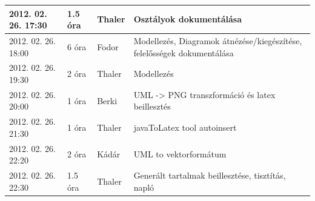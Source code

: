 \begin{center}
\begin{tabular}{| l | p{1.9cm} | p{2.6cm} | p{6.1cm} |}
2012. 02. 26. 17:30 & 1.5 óra & Thaler & Osztályok dokumentálása\\ \hline
2012. 02. 26. 18:00 & 6 óra & Fodor & Modellezés, Diagramok átnézése/kiegészítése, felelősségek dokumentálása\\ \hline
2012. 02. 26. 19:30 & 2 óra & Thaler & Modellezés\\ \hline
2012. 02. 26. 20:00 & 1 óra & Berki & UML -> PNG transzformáció és latex beillesztés\\ \hline
2012. 02. 26. 21:30 & 1 óra & Thaler & javaToLatex tool autoinsert\\ \hline
2012. 02. 26. 22:20 & 2 óra & Kádár & UML to vektorformátum\\ \hline
2012. 02. 26. 22:30 & 1.5 óra & Thaler & Generált tartalmak beillesztése, tisztítás, napló\\ \hline

            \hline
        \end{tabular}
    \end{center}

